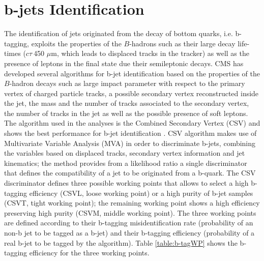 \section{b-jets Identification}
\label{sec:bJet}
The identification of jets originated from the decay of bottom quarks, i.e. b-tagging, exploits 
the properties of the $B$-hadrons such as their large decay life-times ($c\tau~$450 $\mu$m, which leads
to displaced tracks in the tracker) as well as the presence of leptons in the final 
state due their semileptonic decays. CMS has developed several algorithms for b-jet 
identification \cite{Chatrchyan:2012jua} based on the properties of the $B$-hadron 
decays such as large impact parameter with respect to the primary 
vertex of charged particle tracks, a possible secondary vertex 
reconstructed inside the jet, the mass and the number of tracks associated to the secondary
vertex, the number of tracks in the jet as well as the possible presence of soft leptons. The 
algorithm used in the analyses is the Combined Secondary Vertex (CSV) and shows the best 
performance for b-jet identification \cite{CMS:2013vea}. CSV algorithm makes 
use of Multivariate Variable Analysis (MVA) in order to  
discriminate b-jets, combining the variables based 
on displaced tracks, secondary vertex information and jet kinematics; the method
provides from a likelihood ratio a single discriminator that defines the compatibility of a jet to be originated
from a b-quark. The CSV discriminator defines three possible working points that 
allows to select a high b-tagging efficiency (CSVL, loose working point) or 
a high purity of b-jet samples (CSVT, tight working point); the remaining
working point shows a high efficiency preserving high purity 
(CSVM, middle working point). The three working points are defined 
according to their b-tagging misidentification rate (probability of an non-b jet to be tagged as a b-jet)
and their b-tagging efficiency (probability of a real b-jet to be tagged by the algorithm). Table 
\ref{table:b-tagWP} shows the b-tagging efficiency for the three working points.\\


